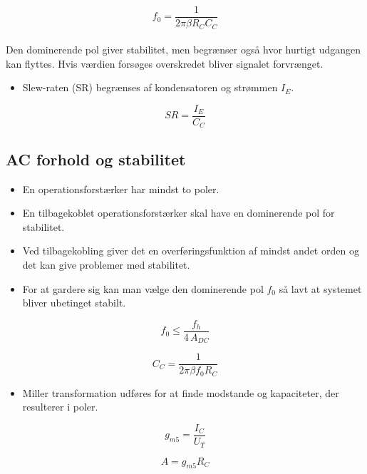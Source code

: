 \documentclass[danish]{article}
\begin{document}
\begin{equation} 
f_0 = \dfrac{1}{2 \pi \beta R_C C_C}
\end{equation}
\\
Den dominerende pol giver stabilitet, men begrænser også hvor hurtigt udgangen kan flyttes. Hvis værdien forsøges overskredet bliver signalet forvrænget.

\begin{itemize}
	\item Slew-raten (SR) begrænses af kondensatoren og strømmen $I_E$.
\end{itemize}

\begin{equation} 
SR = \dfrac{I_E}{C_C}
\end{equation}

\subsection{AC forhold og stabilitet}
\begin{itemize}
	\item En operationsforstærker har mindst to poler.
	\item En tilbagekoblet operationsforstærker skal have en dominerende pol for stabilitet.
	\item Ved tilbagekobling giver det en overføringsfunktion af mindst andet orden og det kan give problemer med stabilitet.
	\item For at gardere sig kan man vælge den dominerende pol $f_0$ så lavt at systemet bliver ubetinget stabilt.
\end{itemize}

\begin{equation} 
f_0  \leq \frac{f_h}{4\,A_{DC}}
\end{equation}

\begin{equation} 
C_C  = \frac{1}{2\pi \beta f_0 R_C}
\end{equation}


\begin{itemize}
	\item Miller transformation udføres for at finde modstande og kapaciteter, der resulterer i poler.
\end{itemize}

\begin{equation} 
g_{m5} = \frac{I_C}{U_T}
\end{equation}

\begin{equation} 
A = g_{m5} R_C
\end{equation}
\end{document}
